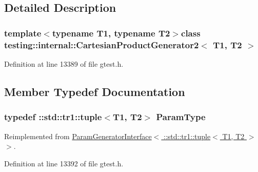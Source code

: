 \subsection{\-Detailed \-Description}
\subsubsection*{template$<$typename T1, typename T2$>$class testing\-::internal\-::\-Cartesian\-Product\-Generator2$<$ T1, T2 $>$}



\-Definition at line 13389 of file gtest.\-h.



\subsection{\-Member \-Typedef \-Documentation}
\hypertarget{classtesting_1_1internal_1_1CartesianProductGenerator2_aa0cb85aed1e62dc1934db8788770bedc}{
\subsubsection[{\-Param\-Type}]{\setlength{\rightskip}{0pt plus 5cm}typedef \-::{\bf std\-::tr1\-::tuple}$<$\-T1, \-T2$>$ {\bf \-Param\-Type}}}\label{d8/d34/classtesting_1_1internal_1_1CartesianProductGenerator2_aa0cb85aed1e62dc1934db8788770bedc}


\-Reimplemented from \hyperlink{classtesting_1_1internal_1_1ParamGeneratorInterface_a1c17d95e5946c3f940ece2bd9165fc34}{\-Param\-Generator\-Interface$<$ \-::std\-::tr1\-::tuple$<$ T1, T2 $>$ $>$}.



\-Definition at line 13392 of file gtest.\-h.




